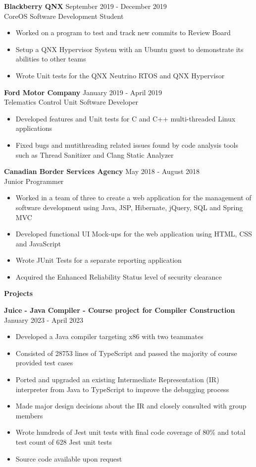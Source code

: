 \documentclass[10pt]{article}
\begin{document}
\textbf{Blackberry QNX}
\hfill September 2019 - December 2019 \\ CoreOS Software Development Student
\begin{itemize}[noitemsep]
    \item Worked on a program to test and track new commits to Review Board
    \item Setup a QNX Hypervisor System with an Ubuntu guest to demonstrate its abilities to other teams
    \item Wrote Unit tests for the QNX Neutrino RTOS and QNX Hypervisor
\end{itemize}

\textbf{Ford Motor Company}
\hfill January 2019 - April 2019 \\ Telematics Control Unit Software Developer
\begin{itemize}[noitemsep]
    \item Developed features and Unit tests for C and C++ multi-threaded Linux applications
    \item Fixed bugs and mutithreading related issues found by code analysis tools such as Thread Sanitizer and Clang Static Analyzer
\end{itemize}

\textbf{Canadian Border Services Agency}
\hfill May 2018 - August 2018 \\ Junior Programmer
\begin{itemize}[noitemsep]
    \item Worked in a team of three to create a web application for the management of software development using Java, JSP, Hibernate, jQuery, SQL and Spring MVC
    \item Developed functional UI Mock-ups for the web application using HTML, CSS and JavaScript
    \item Wrote JUnit Tests for a separate reporting application
    \item Acquired the Enhanced Reliability Status level of security clearance
\end{itemize}

\newpage

{\Large\textbf{Projects}}\space \hrulefill

\textbf{Juice - Java Compiler - Course project for Compiler Construction} \hfill January 2023 - April 2023
\begin{itemize}[noitemsep]
    \item Developed a Java compiler targeting x86 with two teammates
    \item Consisted of 28753 lines of TypeScript and passed the majority of course provided test cases
    \item Ported and upgraded an existing Intermediate Representation (IR) interpreter from Java to TypeScript to improve the debugging process
    \item Made major design decisions about the IR and closely consulted with group members
    \item Wrote hundreds of Jest unit tests with final code coverage of 80\% and total test count of 628 Jest unit tests
    \item Source code available upon request
\end{itemize}
\end{document}

